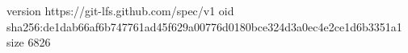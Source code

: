 version https://git-lfs.github.com/spec/v1
oid sha256:de1dab66af6b747761ad45f629a00776d0180bce324d3a0ec4e2ce1d6b3351a1
size 6826
